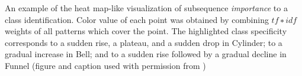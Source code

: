 An example of the heat map-like visualization of subsequence \emph{importance} to a class identification. Color value of each point was obtained by combining $tf∗idf$ weights of all patterns which cover the point. The highlighted class specificity corresponds to a sudden rise, a plateau, and a sudden drop in Cylinder; to a gradual increase in Bell; and to a sudden rise followed by a gradual decline in Funnel (figure and caption used with permission from \cite{senin_sax-vsm:_2013})
\label{fig:specificity_example}